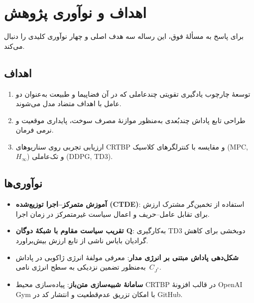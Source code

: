 

\section{اهداف و نوآوری پژوهش}\label{sec:objectives}

برای پاسخ به مسألهٔ فوق، این رساله سه هدف اصلی و چهار نوآوری کلیدی را دنبال می‌کند.

\subsection*{اهداف}
\begin{enumerate}
	\item توسعهٔ چارچوب یادگیری تقویتی چندعاملی که در آن فضاپیما و طبیعت به‌عنوان دو عامل با اهداف متضاد مدل می‌شوند.
	\item طراحی تابع پاداش چندبُعدی به‌منظور موازنهٔ مصرف سوخت، پایداری موقعیت و نرمی فرمان.
	\item ارزیابی تجربی روی سناریوهای {{CRTBP}} و مقایسه با کنترلگرهای کلاسیک (MPC, $H_\infty$) و تک‌عاملی (DDPG, TD3).
\end{enumerate}

\subsection*{نوآوری‌ها}
\begin{itemize}
	\item \textbf{آموزش متمرکز–اجرا توزیع‌شده (CTDE)}: استفاده از تخمین‌گر مشترک ارزش برای تقابل عامل–حریف و اعمال سیاست غیرمتمرکز در زمان اجرا.
	\item \textbf{تقریب سیاست مقاوم با شبکهٔ دوگان Q}: به‌کارگیری TD3 دوبخشی برای کاهش گرادیان بایاس ناشی از تابع ارزش بیش‌براورد.
	\item \textbf{شکل‌دهی پاداش مبتنی بر انرژی مدار}: معرفی مولفهٔ انرژی ژاکوبی در پاداش به‌منظور تضمین نزدیکی به سطح انرژی نامی~$C_{J^\ast}$.
	\item \textbf{سامانهٔ شبیه‌سازی متن‌باز}: پیاده‌سازی محیط CRTBP در قالب افزونهٔ {OpenAI Gym} با امکان تزریق عدم‌قطعیت و انتشار کد در GitHub.
\end{itemize}